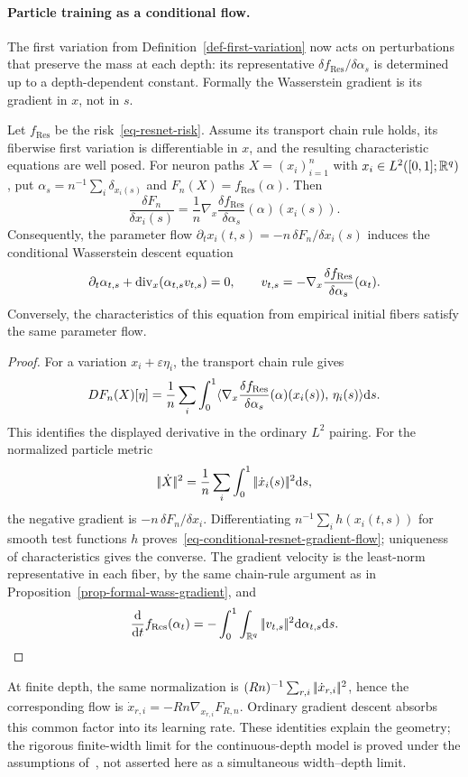 \paragraph{Particle training as a conditional flow.}
The first variation from Definition~\ref{def-first-variation} now acts on perturbations that preserve the mass at each depth: its representative $\delta f_{\mathrm{Res}}/\delta\alpha_s$ is determined up to a depth-dependent constant. Formally the Wasserstein gradient is its gradient in $x$, not in $s$.
\begin{prop}\label{prop-resnet-particle-flow}
Let $f_{\mathrm{Res}}$ be the risk~\eqref{eq-resnet-risk}. Assume its transport chain rule holds, its fiberwise first variation is differentiable in $x$, and the resulting characteristic equations are well posed. For neuron paths $X=(x_i)_{i=1}^n$ with $x_i\in L^2([0,1];\mathbb{R}^q)$, put $\alpha_s=n^{-1}\sum_i\delta_{x_i(s)}$ and $F_n(X)=f_{\mathrm{Res}}(\alpha)$. Then
\[
  \frac{\delta F_n}{\delta x_i(s)}
  =\frac1n\nabla_x\frac{\delta f_{\mathrm{Res}}}{\delta\alpha_s}(\alpha)(x_i(s)).
\]
Consequently, the parameter flow $\partial_t x_i(t,s)=-n\,\delta F_n/\delta x_i(s)$ induces the conditional Wasserstein descent equation
\begin{equation}\label{eq-conditional-resnet-gradient-flow}
  \partial_t\alpha_{t,s}+\operatorname{div}_x(\alpha_{t,s}v_{t,s})=0,
  \qquad v_{t,s}=-\nabla_x\frac{\delta f_{\mathrm{Res}}}{\delta\alpha_s}(\alpha_t).
\end{equation}
Conversely, the characteristics of this equation from empirical initial fibers satisfy the same parameter flow.
\end{prop}
\begin{proof}
For a variation $x_i+\varepsilon\eta_i$, the transport chain rule gives
\[
  DF_n(X)[\eta]
  =\frac1n\sum_i\int_0^1
  \langle \nabla_x\frac{\delta f_{\mathrm{Res}}}{\delta\alpha_s}(\alpha)(x_i(s)),\,\eta_i(s)\rangle\mathrm{d} s.
\]
This identifies the displayed derivative in the ordinary $L^2$ pairing. For the normalized particle metric
\[
  |\!| \dot X |\!|^2=\frac1n\sum_i\int_0^1|\!| \dot x_i(s) |\!|^2\mathrm{d} s,
\]
the negative gradient is $-n\,\delta F_n/\delta x_i$. Differentiating $n^{-1}\sum_i h(x_i(t,s))$ for smooth test functions $h$ proves~\eqref{eq-conditional-resnet-gradient-flow}; uniqueness of characteristics gives the converse. The gradient velocity is the least-norm representative in each fiber, by the same chain-rule argument as in Proposition~\ref{prop-formal-wass-gradient}, and
\[
  \frac{\mathrm{d}}{\mathrm{d} t}f_{\mathrm{Res}}(\alpha_t)=-\int_0^1\int_{\mathbb{R}^q}|\!| v_{t,s} |\!|^2\mathrm{d}\alpha_{t,s}\mathrm{d} s.
\]
\end{proof}
At finite depth, the same normalization is $(Rn)^{-1}\sum_{r,i}|\!| \dot x_{r,i} |\!|^2$, hence the corresponding flow is $\dot x_{r,i}=-Rn\nabla_{x_{r,i}}F_{R,n}$. Ordinary gradient descent absorbs this common factor into its learning rate. These identities explain the geometry; the rigorous finite-width limit for the continuous-depth model is proved under the assumptions of~\cite{BarboniPeyreVialard2024ConditionalResNets}, not asserted here as a simultaneous width--depth limit.

